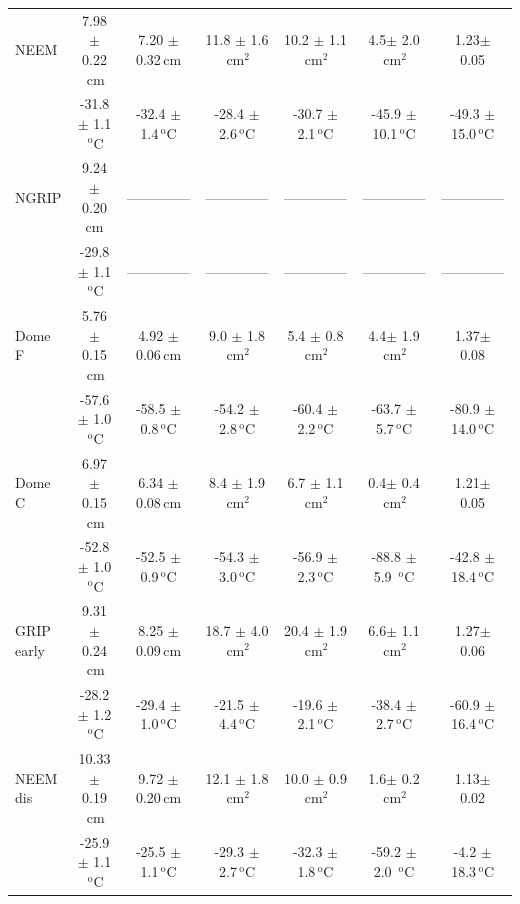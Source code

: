 \documentclass[11pt, draftcls, onecolumn]{IEEEtran} %
\numberwithin{equation}{section}
\numberwithin{table}{section}
\numberwithin{figure}{section}
\begin{document}
\begin{table}[]
\begin{tabular}{l c c c c c c}
		NEEM&7.98 $\pm$ 0.22$\,\mathrm{cm}$& 7.20 $\pm$ 0.32$\,\mathrm{cm}$& 11.8 $\pm$ 1.6$\,\mathrm{cm}^2$& 10.2 $\pm$ 1.1$\,\mathrm{cm}^2$& 4.5$\pm$ 2.0$\,\mathrm{cm}^2$& 1.23$\pm$ 0.05\\
		& -31.8 $\pm$ 1.1$\,^\mathrm{o}$C & -32.4 $\pm$ 1.4$\,^\mathrm{o}$C& -28.4 $\pm$ 2.6$\,^\mathrm{o}$C& -30.7 $\pm$ 2.1$\,^\mathrm{o}$C& -45.9 $\pm$ 10.1$\,^\mathrm{o}$C& -49.3 $\pm$ 15.0$\,^\mathrm{o}$C\\
		
		NGRIP &9.24 $\pm$ 0.20 $\mathrm{cm}$&-------------- &--------------&-------------- & --------------&-------------- \\
		& -29.8 $\pm$ 1.1$\,^\mathrm{o}$C &--------------& --------------& --------------& --------------&--------------\\	
		
		Dome F&5.76 $\pm$ 0.15$\,\mathrm{cm}$& 4.92 $\pm$ 0.06$\,\mathrm{cm}$& 9.0 $\pm$ 1.8$\,\mathrm{cm}^2$& 5.4 $\pm$ 0.8$\,\mathrm{cm}^2$& 4.4$\pm$ 1.9$\,\mathrm{cm}^2$& 1.37$\pm$ 0.08\\
		& -57.6 $\pm$ 1.0$\,^\mathrm{o}$C & -58.5 $\pm$ 0.8$\,^\mathrm{o}$C& -54.2 $\pm$ 2.8$\,^\mathrm{o}$C& -60.4 $\pm$ 2.2$\,^\mathrm{o}$C& -63.7 $\pm$ 5.7$\,^\mathrm{o}$C& -80.9 $\pm$ 14.0$\,^\mathrm{o}$C\\
		
		Dome C &6.97 $\pm$ 0.15$\,\mathrm{cm}$& 6.34 $\pm$ 0.08$\,\mathrm{cm}$& 8.4 $\pm$ 1.9$\,\mathrm{cm}^2$& 6.7 $\pm$ 1.1$\,\mathrm{cm}^2$& 0.4$\pm$ 0.4$\,\mathrm{cm}^2$& 1.21$\pm$ 0.05\\
		& -52.8 $\pm$ 1.0 $\,^\mathrm{o}$C & -52.5 $\pm$ 0.9$\,^\mathrm{o}$C& -54.3 $\pm$ 3.0$\,^\mathrm{o}$C& -56.9 $\pm$ 2.3$\,^\mathrm{o}$C& -88.8 $\pm$ 5.9 $\,^\mathrm{o}$C& -42.8 $\pm$ 18.4$\,^\mathrm{o}$C\\
		
		GRIP early &9.31 $\pm$ 0.24$\,\mathrm{cm}$& 8.25 $\pm$ 0.09$\,\mathrm{cm}$& 18.7 $\pm$ 4.0$\,\mathrm{cm}^2$& 20.4 $\pm$ 1.9$\,\mathrm{cm}^2$& 6.6$\pm$ 1.1$\,\mathrm{cm}^2$& 1.27$\pm$ 0.06\\
		& -28.2 $\pm$ 1.2$\,^\mathrm{o}$C & -29.4 $\pm$ 1.0$\,^\mathrm{o}$C& -21.5 $\pm$ 4.4$\,^\mathrm{o}$C& -19.6 $\pm$ 2.1$\,^\mathrm{o}$C& -38.4 $\pm$ 2.7$\,^\mathrm{o}$C& -60.9 $\pm$ 16.4$\,^\mathrm{o}$C\\
		
		NEEM dis &10.33 $\pm$ 0.19$\,\mathrm{cm}$& 9.72 $\pm$ 0.20$\,\mathrm{cm}$& 12.1 $\pm$ 1.8$\,\mathrm{cm}^2$& 10.0 $\pm$ 0.9$\,\mathrm{cm}^2$& 1.6$\pm$ 0.2$\,\mathrm{cm}^2$& 1.13$\pm$ 0.02\\
		& -25.9 $\pm$ 1.1$\,^\mathrm{o}$C & -25.5 $\pm$ 1.1$\,^\mathrm{o}$C& -29.3 $\pm$ 2.7$\,^\mathrm{o}$C& -32.3 $\pm$ 1.8$\,^\mathrm{o}$C& -59.2 $\pm$ 2.0 $\,^\mathrm{o}$C& -4.2 $\pm$ 18.3$\,^\mathrm{o}$C\\
		

\end{tabular}
\end{table}
\end{document}
